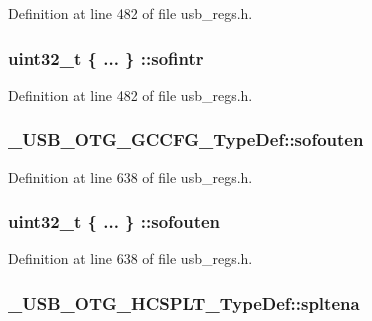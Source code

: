 Definition at line 482 of file usb\-\_\-regs.\-h.

\hypertarget{group___u_s_b___o_t_g___d_r_i_v_e_r_ga73984068388b10c297fa565bc9d0b6d3}{
\subsubsection[{sofintr}]{\setlength{\rightskip}{0pt plus 5cm}uint32\-\_\-t \{ ... \} \-::sofintr}}\label{group___u_s_b___o_t_g___d_r_i_v_e_r_ga73984068388b10c297fa565bc9d0b6d3}


Definition at line 482 of file usb\-\_\-regs.\-h.

\hypertarget{group___u_s_b___o_t_g___d_r_i_v_e_r_gaee6a6008a6f826c15f2592bcba504bf8}{
\subsubsection[{sofouten}]{ \-\_\-\-U\-S\-B\-\_\-\-O\-T\-G\-\_\-\-G\-C\-C\-F\-G\-\_\-\-Type\-Def\-::sofouten}}\label{group___u_s_b___o_t_g___d_r_i_v_e_r_gaee6a6008a6f826c15f2592bcba504bf8}


Definition at line 638 of file usb\-\_\-regs.\-h.

\hypertarget{group___u_s_b___o_t_g___d_r_i_v_e_r_ga3254034b3de3d67b65d2f233918eecf3}{
\subsubsection[{sofouten}]{\setlength{\rightskip}{0pt plus 5cm}uint32\-\_\-t \{ ... \} \-::sofouten}}\label{group___u_s_b___o_t_g___d_r_i_v_e_r_ga3254034b3de3d67b65d2f233918eecf3}


Definition at line 638 of file usb\-\_\-regs.\-h.

\hypertarget{group___u_s_b___o_t_g___d_r_i_v_e_r_ga718ce486934cafa52254fe9597562689}{
\subsubsection[{spltena}]{ \-\_\-\-U\-S\-B\-\_\-\-O\-T\-G\-\_\-\-H\-C\-S\-P\-L\-T\-\_\-\-Type\-Def\-::spltena}}\label{group___u_s_b___o_t_g___d_r_i_v_e_r_ga718ce486934cafa52254fe9597562689}


